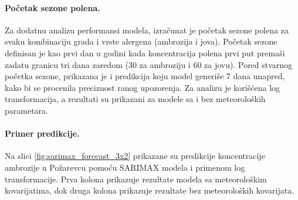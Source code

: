 \documentclass[12pt]{article}
\begin{document}
\paragraph{Početak sezone polena.}  
Za dodatnu analizu performansi modela, izračunat je početak sezone polena za svaku kombinaciju grada i vrste alergena (ambrozija i jova). Početak sezone definisan je kao prvi dan u godini kada koncentracija polena prvi put premaši zadatu granicu tri dana zaredom (30 za ambroziju i 60 za jovu). Pored stvarnog početka sezone, prikazana je i predikcija koju model generiše 7 dana unapred, kako bi se procenila preciznost ranog upozorenja. Za analizu je korišćena log transformacija, a rezultati su prikazani za modele sa i bez meteoroloških parametara.

\begin{table}[h!]
\centering
\caption{Početak sezone polena: stvarni datum i predikcija 7 dana unapred (sa i bez meteo).}
\label{tab:start_season}
\end{table}




\paragraph{\textbf{Primer predikcije.}}  
Na slici \ref{fig:sarimax_forecast_3x2} prikazane su predikcije koncentracije ambrozije u Požarevcu pomoću SARIMAX modela i primenom log transformacije.  
Prva kolona prikazuje rezultate modela sa meteorološkim kovarijatima, dok druga kolona prikazuje rezultate bez meteoroloških kovarijata.
\end{document}

